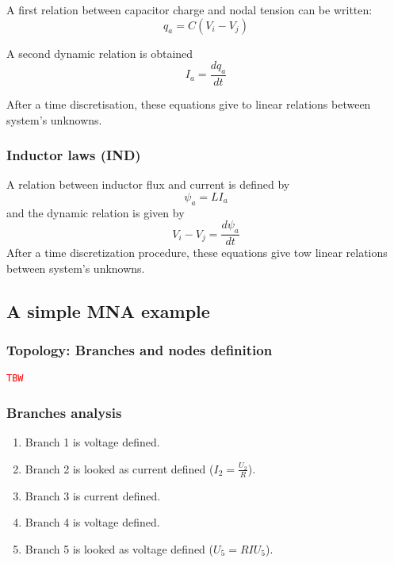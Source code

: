 A first relation between capacitor charge and nodal tension can be written:\\
\begin{equation}
 q_{a}=C(V_{i}-V_{j})\label{eq:CAP1}\tag{CAP1}
\end{equation}

A second dynamic relation is obtained
\begin{equation}
I_{a}=\frac{dq_{a}}{dt} \label{eq:CAP2}\tag{CAP2}
\end{equation}


After a time discretisation, these equations give to linear relations between system's unknowns.
\subsubsection{Inductor laws (IND)}
A relation between inductor flux and current is defined by
\begin{equation}
\psi _{a}=LI_{a}\label{eq:IND1}\tag{IND1}
\end{equation}
and the  dynamic relation is given by
\begin{equation}
  \label{eq:IND2}
   V_{i}-V_{j}=\frac{d\psi _{a}}{dt} \tag{IND2}
\end{equation}
After a time discretization procedure, these equations give tow linear relations between system's unknowns.
\newpage
\subsection{A simple MNA example}
\begin{figure}[h]
\centerline{
 \scalebox{0.5}{
    
 }
}
\end{figure}

\subsubsection{Topology: Branches and nodes definition}

 \textcolor{red}{\tt TBW}
\subsubsection{Branches analysis}

\begin{enumerate}
\item Branch 1 is voltage defined.
\item Branch 2 is looked as current defined ($I_{2}=\frac{U_{2}}{R}$).
\item Branch 3 is current defined.
\item Branch 4 is voltage defined.
\item Branch 5 is looked as voltage defined ($U_{5}=RIU_{5}$).
\end{enumerate}
